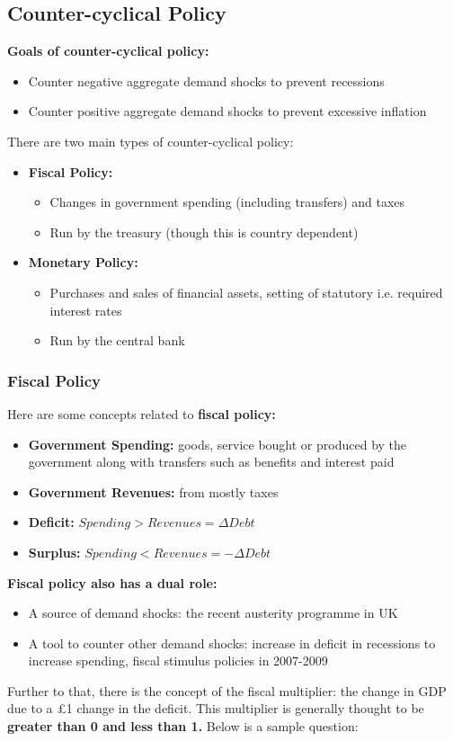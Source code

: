 \documentclass[12pt, letterpaper]{article}
\begin{document}
\subsection{Counter-cyclical Policy}
\textbf{Goals of counter-cyclical policy:}
\begin{itemize}
	\item Counter negative aggregate demand shocks to prevent recessions
	\item Counter positive aggregate demand shocks to prevent excessive inflation
\end{itemize}

There are two main types of counter-cyclical policy:
\begin{itemize}
	\item \textbf{Fiscal Policy:}
		\begin{itemize}
			\item Changes in government spending (including transfers) and taxes
			\item Run by the treasury (though this is country dependent)
		\end{itemize}
	\item \textbf{Monetary Policy:}
		\begin{itemize}
			\item Purchases and sales of financial assets, setting of statutory i.e. required interest rates
			\item Run by the central bank
		\end{itemize}
\end{itemize}

\subsubsection{Fiscal Policy}
Here are some concepts related to \textbf{fiscal policy:}
\begin{itemize}
	\item \textbf{Government Spending:} goods, service bought or produced by the government along with transfers such as benefits and interest paid
	\item \textbf{Government Revenues:} from mostly taxes
	\item \textbf{Deficit:} $Spending > Revenues = \Delta Debt$
	\item \textbf{Surplus:} $Spending < Revenues = -\Delta Debt$ \\
\end{itemize} 
\textbf{Fiscal policy also has a dual role:}
\begin{itemize}
	\item A source of demand shocks: the recent austerity programme in UK
	\item A tool to counter other demand shocks: increase in deficit in recessions to increase spending, fiscal stimulus policies in 2007-2009\\
\end{itemize}
Further to that, there is the concept of the fiscal multiplier: the change in GDP due to a £1 change in the deficit. This multiplier is generally thought to be \textbf{greater than 0 and less than 1.} Below is a sample question:
\end{document}
